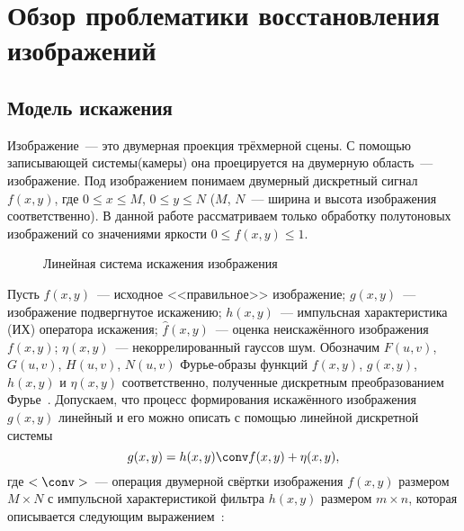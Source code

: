 \chapter{Обзор проблематики восстановления изображений}
\section{Модель искажения}\label{seqtion:distortionModel}
Изображение~--- это двумерная проекция трёхмерной сцены. С помощью записывающей системы(камеры) она проецируется на двумерную область~--- изображение. Под изображением понимаем двумерный дискретный сигнал $f(x,y)$, где $0\leq x \leq M$, $0\leq y\leq N$ ($M$, $N$~--- ширина и высота изображения соответственно). В данной работе рассматриваем только обработку полутоновых изображений со значениями яркости $0\leq f(x,y)\leq 1$.

\begin{figure}[h!]
    \centering
    \caption{Линейная система искажения изображения}
    \label{fig:distortionScheme}
\end{figure}

Пусть $f(x,y)$~--- исходное <<правильное>> изображение; $g(x,y)$~--- изображение подвергнутое искажению; $h(x,y)$~--- импульсная характеристика (ИХ) оператора искажения; $\hat{f}(x,y)$~--- оценка неискажённого изображения $f(x,y)$; $\eta(x,y)$~--- некоррелированный гауссов шум. Обозначим $F(u,v)$, $G(u,v)$, $H(u,v)$, $N(u,v)$ Фурье-образы функций $f(x,y)$, $g(x,y)$, $h(x,y)$ и $\eta(x,y)$ соответственно, полученные дискретным преобразованием Фурье~\cite[стр.~332]{gonsalesDigital2012}.
Допускаем, что процесс формирования искажённого изображения $g(x, y)$ линейный и его можно описать с помощью линейной дискретной системы \cite[стр.~403]{gonsalesDigital2012}
\begin{equation}\label{eq:distortion}
g(x, y) = h(x,y) \conv f(x,y) + \eta(x,y),
\end{equation}
где $<\conv>$~--- операция двумерной свёртки изображения $f(x,y)$ размером $M\times N$ с импульсной характеристикой фильтра $h(x,y)$ размером $m\times n$, которая описывается следующим выражением~\cite[стр.~298]{gonsalesDigital2012}:

